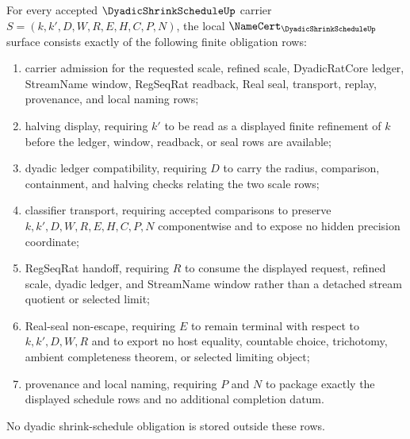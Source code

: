 \begin{theorem}
\label{thm:dyadic-shrink-schedule-namecert-obligations}
For every accepted $\DyadicShrinkScheduleUp$ carrier $S=(k,k',D,W,R,E,H,C,P,N)$, the local $\NameCert_{\DyadicShrinkScheduleUp}$ surface consists exactly of the following finite obligation rows:
\begin{enumerate}
\item carrier admission for the requested scale, refined scale, DyadicRatCore ledger, StreamName window, RegSeqRat readback, Real seal, transport, replay, provenance, and local naming rows;
\item halving display, requiring $k'$ to be read as a displayed finite refinement of $k$ before the ledger, window, readback, or seal rows are available;
\item dyadic ledger compatibility, requiring $D$ to carry the radius, comparison, containment, and halving checks relating the two scale rows;
\item classifier transport, requiring accepted comparisons to preserve $k,k',D,W,R,E,H,C,P,N$ componentwise and to expose no hidden precision coordinate;
\item RegSeqRat handoff, requiring $R$ to consume the displayed request, refined scale, dyadic ledger, and StreamName window rather than a detached stream quotient or selected limit;
\item Real-seal non-escape, requiring $E$ to remain terminal with respect to $k,k',D,W,R$ and to export no host equality, countable choice, trichotomy, ambient completeness theorem, or selected limiting object;
\item provenance and local naming, requiring $P$ and $N$ to package exactly the displayed schedule rows and no additional completion datum.
\end{enumerate}
No dyadic shrink-schedule obligation is stored outside these rows.
\end{theorem}
